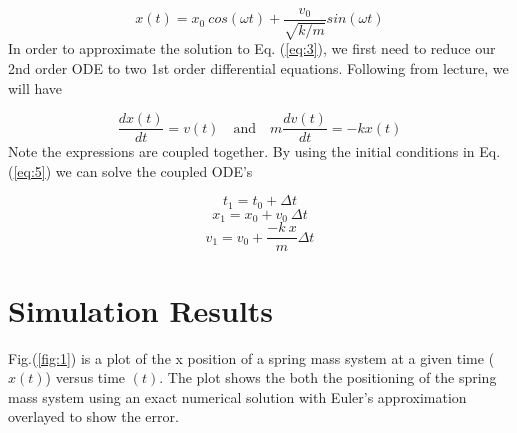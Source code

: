 \documentclass{article}
\begin{document}
\begin{equation}
\label{eq:6}
x(t) = x_0 \ cos(\omega t) + \frac{v_0}{\sqrt{k / m}} sin(\omega t)
\end{equation}
In order to approximate the solution to Eq. (\ref{eq:3}), we first need to reduce our 2nd order ODE to two 1st order
differential equations. Following from lecture, we will have

\begin{equation}
\label{eq:7}
\frac{dx(t)}{dt} = v(t) 
	\quad\text{and}\quad  
m \frac{dv(t)}{dt} = -kx(t)
\end{equation}
Note the expressions are coupled together. By using the initial conditions in Eq. (\ref{eq:5}) we can solve the coupled ODE's

\begin{equation}
\label{eq:8}
t_1 = t_0 + \Delta t
\end{equation}
\begin{equation}
\label{eq:9}
x_1 = x_0 + v_0 \ \Delta t
\end{equation}
\begin{equation}
\label{eq:10}
v_1 = v_0 + \frac{-k \ x}{m} \Delta t
\end{equation}



\pagebreak
\section{Simulation Results}
Fig.(\ref{fig:1}) is a plot of the x position of a spring mass system at a given time ($x(t)$) versus time $(t)$. The plot shows the both the positioning of the spring mass system using an exact numerical solution with Euler's approximation overlayed to show the error.
\end{document}
